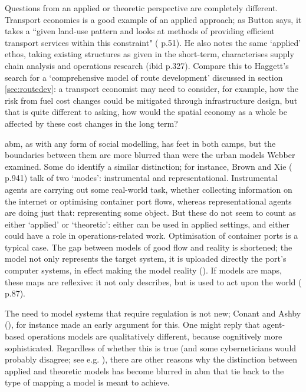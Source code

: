 Questions from an applied or theoretic perspective are completely different. Transport economics is a good example of an applied approach; as Button says, it takes a ``given land-use pattern and looks at methods of providing efficient transport services within this constraint" (\citealt{button_transport_2010} p.51). He also notes the same `applied' ethos, taking existing structures as given in the short-term, characterises supply chain analysis and operations research (ibid p.327). Compare this to Haggett's search for a `comprehensive model of route development' discussed in section \ref{sec:routedev}: a transport economist may need to consider, for example, how the risk from fuel cost changes could be mitigated through infrastructure design, but that is quite different to asking, how would the spatial economy as a whole be affected by these cost changes in the long term?

\gls{abm}, as with any form of social modelling, has feet in both camps, but the boundaries between them are more blurred than were the urban models Webber examined. Some do identify a similar distinction; for instance, Brown and Xie (\citeyear{brown_spatial_2006} p.941) talk of two `modes': instrumental and representational. Instrumental agents are carrying out some real-world task, whether collecting information on the internet or optimising container port flows, whereas representational agents are doing just that: representing some object. But these do not seem to count as either `applied' or `theoretic': either can be used in applied settings, and either could have a role in operations-related work. Optimisation of container ports is a typical case. The gap between models of good flow and reality is shortened; the model not only represents the target system, it is uploaded directly the port's computer systems, in effect making the model reality (\citealt{steenken_container_2004}). If models are maps, these maps are reflexive: it not only describes, but is used to act upon the world (\citealt{scott_seeing_1998} p.87). 

The need to model systems that require regulation is not new; Conant and Ashby (\citeyear{conant_every_1970}), for instance made an early argument for this. One might reply that agent-based operations models are qualitatively different, because cognitively more sophisticated. Regardless of whether this is true (and some cyberneticians would probably disagree; see e.g. \citealt{beer_brain_1994}), there are other reasons why the distinction between applied and theoretic models has become blurred in \gls{abm} that tie back to the type of mapping a model is meant to achieve. 


